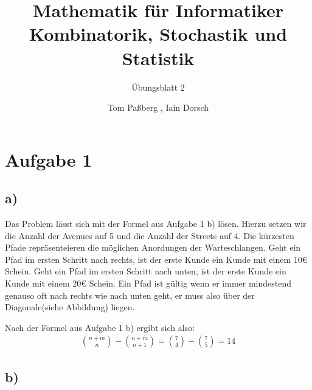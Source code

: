 \documentclass[a4paper]{scrartcl}
\title{Mathematik für Informatiker \\ Kombinatorik, Stochastik und Statistik}
\subtitle{Übungsblatt 2}
\author{Tom Paßberg , Iain Dorsch}
\date{}
\begin{document}
\maketitle

\newpage
\section*{Aufgabe 1}
\subsection*{a)}

Das Problem lässt sich mit der Formel aus Aufgabe 1 b) lösen.
Hierzu setzen wir die Anzahl der Avenues auf 5 und die Anzahl der Streets auf 4.
Die kürzesten Pfade repräsenteieren die möglichen Anordungen der Warteschlangen.
Geht ein Pfad im ersten Schritt nach rechts, ist der erste Kunde ein Kunde mit einem 10€ Schein.
Geht ein Pfad im ersten Schritt nach unten, ist der erste Kunde ein Kunde mit einem 20€ Schein.
Ein Pfad ist gültig wenn er immer mindestend genauso oft nach rechts wie nach unten geht, er muss also über der Diagonale(siehe Abbildung) liegen.

\begin{center}
\end{center}

Nach der Formel aus Aufgabe 1 b) ergibt sich also:
\begin{align*}
    \binom{n+m}{n} - \binom{n+m}{n+1} = \binom{7}{4} - \binom{7}{5} = 14
\end{align*}
    
\subsection*{b)}
\newpage
\end{document}
